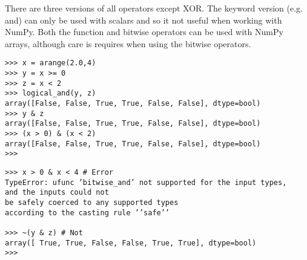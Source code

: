 \documentclass[KSmainSlides.tex]{subfiles}
\begin{document}
\begin{frame}[fragile]

\noindent There are three versions of all operators except XOR. The keyword version (e.g. and) can only be used
with scalars and so it not useful when working with NumPy. Both the function and bitwise operators
can be used with NumPy arrays, although care is requires when using the bitwise operators.
\end{frame}
\begin{frame}[fragile]
	
\begin{framed}
\begin{verbatim}
>>> x = arange(2.0,4)
>>> y = x >= 0
>>> z = x < 2
>>> logical_and(y, z)
array([False, False, True, True, False, False], dtype=bool)
>>> y & z
array([False, False, True, True, False, False], dtype=bool)
>>> (x > 0) & (x < 2)
array([False, False, True, True, False, False], dtype=bool)
>>>
\end{verbatim}
\end{framed}
\end{frame}
\begin{frame}[fragile]

\begin{framed}
\begin{verbatim}
>>> x > 0 & x < 4 # Error
TypeError: ufunc ’bitwise_and’ not supported for the input types, 
and the inputs could not
be safely coerced to any supported types 
according to the casting rule ’’safe’’

>>> ~(y & z) # Not
array([ True, True, False, False, True, True], dtype=bool)
>>>
\end{verbatim}
\end{framed}
\end{frame}
\begin{frame}[fragile]
	\newpage
\end{frame}
\end{document}
